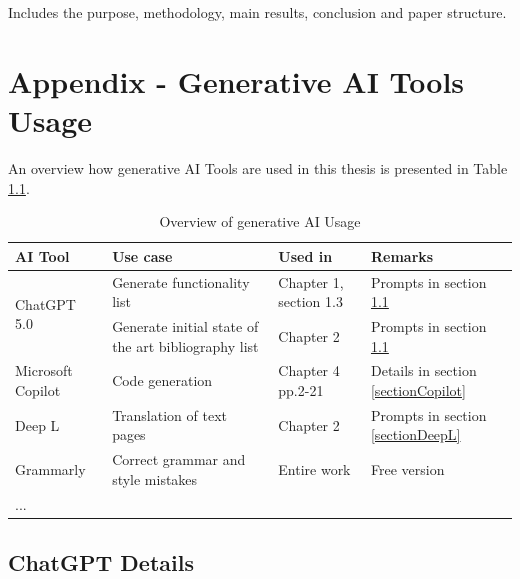 \documentclass[12pt,a4paper]{book}
\theoremstyle{definition}
\theoremstyle{remark}
\begin{document}
\noindent Includes the purpose, methodology, main results, conclusion and paper structure.


\tableofcontents








\appendix
\chapter{Appendix - Generative AI Tools Usage}
\label{genAIUsage}

An overview how  generative AI Tools are used in this thesis is presented in Table \ref{tab:genAIOverview}.

\begin{table}[h!]
    \centering
    \begin{tabularx}{\textwidth}{|l|X|X|X|}
            \hline \rowcolor{blue!20}
         AI Tool& Use case & Used in & Remarks \\\hline
         \multirow{2}{*}{ChatGPT 5.0} & Generate functionality list & Chapter 1, section 1.3& Prompts in section \ref{sectionGhatGPT}\\ \cline{2-4}
          
          & Generate initial state of the art bibliography list & Chapter 2 & Prompts in section \ref{sectionGhatGPT}\\ \hline
         
         Microsoft Copilot & Code generation & Chapter 4 pp.2-21  & Details in section \ref{sectionCopilot}\\ \hline
         Deep L &  Translation of text pages & Chapter 2 & Prompts in section \ref{sectionDeepL} \\ \hline
         Grammarly & Correct grammar and style mistakes & Entire work & Free version\\ \hline
         ... &  & & \\\hline
    \end{tabularx}
    \caption{Overview of generative AI Usage}
    \label{tab:genAIOverview}
\end{table}




    
\section{ChatGPT Details} 
\label{sectionGhatGPT}
\end{document}
